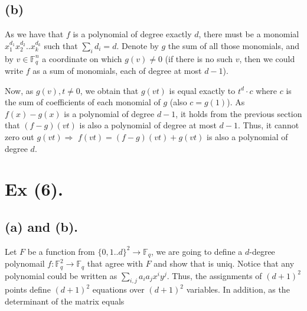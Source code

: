 \documentclass{article}
\newcommand{\FF}{\mathbb{F}}
\begin{document}
\subsection{(b)} As we have that $f$ is a polynomial of degree exactly $d$, there must be a monomial $x_{1}^{d_{1}}x_{2}^{d_{2}}..x_{k}^{d_{k}}$ such that $\sum_{i}{d_{i}} = d$. Denote by $g$ the sum of all those monomials, and by $v \in \FF_{q}^{n}$ a coordinate on which $g(v) \neq 0$ (if there is no such $v$, then we could write $f$ as a sum of monomials, each of degree at most $d-1$).

Now, as $g(v),t \neq 0$, we obtain that $g(vt)$ is equal exactly to $t^{d}\cdot c$ where $c$ is the sum of coefficients of each monomial of $g$ (also $c = g(1)$). As $f(x) - g(x)$ is a polynomial of degree $d-1$, it holds from the previous section that $(f-g)(vt)$ is also a polynomial of degree at most $d-1$. Thus, it cannot zero out $g(vt) \Rightarrow$ $f(vt) = (f - g)(vt) + g(vt)$ is also a polynomial of degree $d$.        

\section{Ex (6).}
\subsection{(a) and (b).} Let $F$ be a function from $ \{0,1.. d \}^{2} \rightarrow \FF_{q}$, we are going to define a $d$-degree polynomail $f : \FF_{q}^{2}\rightarrow \FF_{q}$  that agree with $F$ and show that is uniq. Notice that any polynomial could be written as $\sum_{i,j}{a_{i}a_{j}x^{i}y^{j}}$. Thus, the assignments of $(d+1)^{2}$ points define $(d+1)^{2}$ equations over $(d+1)^{2}$ variables. In addition, as the determinant of the matrix equals
\end{document}
